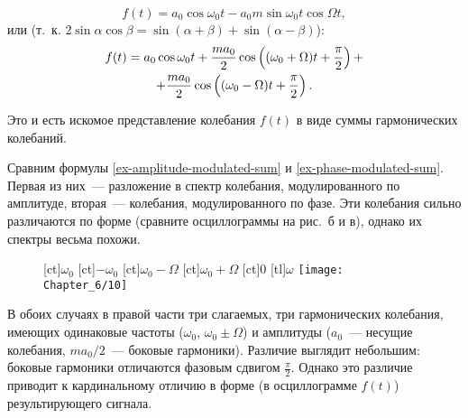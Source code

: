 \begin{equation*}
	f(t)=a_0\cos\omega_0t-a_0 m\sin\omega_0t\cos\Omega t,
\end{equation*}
или (т.~к. $2\sin\alpha\cos\beta=\sin(\alpha+\beta)+\sin(\alpha-\beta)$):
\begin{multline}
	\eqmark{ex-phase-modulated-sum}
	f(t)=a_0\cos\omega_0t+\frac{ma_0}{2}\cos\left((\omega_0+\Omega)t+\frac{\pi}{2}\right)+\\
	+\frac{ma_0}{2}\cos\left((\omega_0-\Omega)t+\frac{\pi}{2}\right).
\end{multline}

Это и есть искомое представление колебания $f(t)$ в виде суммы гармонических колебаний.

Сравним формулы \eqref{ex-amplitude-modulated-sum} и \eqref{ex-phase-modulated-sum}. Первая из них~--- разложение в спектр колебания, модулированного по амплитуде,
вторая~--- колебания, модулированного по фазе. Эти колебания сильно различаются по форме (сравните осциллограммы на
рис.~б и в), однако их спектры весьма похожи.

\begin{wrapfigure}{r}{0.35\textwidth}
	\small
	[ct]{$\omega_0$}
	[ct]{$-\omega_0$}
	[ct]{$\omega_0-\Omega$}
	[ct]{$\omega_0+\Omega$}
	[ct]{0}
	[tl]{$\omega$}
	\texttt{[image: Chapter\_6/10]}
	\caption{}
\end{wrapfigure}

В обоих случаях в правой части три слагаемых, три гармонических колебания, имеющих одинаковые частоты ($\omega_0$,
$\omega_0\pm\Omega$) и амплитуды ($a_0$~--- несущие колебания, $ma_0/2$~--- боковые гармоники). Различие выглядит
небольшим: боковые гармоники отличаются фазовым сдвигом $\frac{\pi}{2}$. Однако это различие приводит к кардинальному
отличию в форме (в осциллограмме $f(t)$) результирующего сигнала. 


